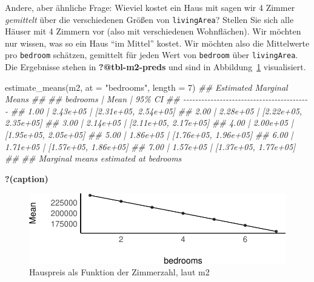 \documentclass[
  a4paper,
  DIV=11]{scrreprt}
\newenvironment{Shaded}{\begin{snugshade}}{\end{snugshade}}
\newcommand{\AttributeTok}[1]{\textcolor[rgb]{0.40,0.45,0.13}{#1}}
\newcommand{\DecValTok}[1]{\textcolor[rgb]{0.68,0.00,0.00}{#1}}
\newcommand{\DocumentationTok}[1]{\textcolor[rgb]{0.37,0.37,0.37}{\textit{#1}}}
\newcommand{\FunctionTok}[1]{\textcolor[rgb]{0.28,0.35,0.67}{#1}}
\newcommand{\NormalTok}[1]{\textcolor[rgb]{0.00,0.23,0.31}{#1}}
\newcommand{\StringTok}[1]{\textcolor[rgb]{0.13,0.47,0.30}{#1}}
\theoremstyle{definition}
\theoremstyle{remark}
\begin{document}
Andere, aber ähnliche Frage: Wieviel kostet ein Haus mit sagen wir 4
Zimmer \emph{gemittelt} über die verschiedenen Größen von
\texttt{livingArea}? Stellen Sie sich alle Häuser mit 4 Zimmern vor
(also mit verschiedenen Wohnflächen). Wir möchten nur wissen, was so ein
Haus ``im Mittel'' kostet. Wir möchten also die Mittelwerte pro
\texttt{bedroom} schätzen, gemittelt für jeden Wert von \texttt{bedroom}
über \texttt{livingArea}. Die Ergebnisse stehen in
\textbf{?@tbl-m2-preds} und sind in Abbildung~\ref{fig-m2-preds}
visualisiert.

\begin{Shaded}
\begin{Highlighting}[]
\FunctionTok{estimate\_means}\NormalTok{(m2, }\AttributeTok{at =} \StringTok{"bedrooms"}\NormalTok{, }\AttributeTok{length =} \DecValTok{7}\NormalTok{)}
\DocumentationTok{\#\# Estimated Marginal Means}
\DocumentationTok{\#\# }
\DocumentationTok{\#\# bedrooms |     Mean |               95\% CI}
\DocumentationTok{\#\# {-}{-}{-}{-}{-}{-}{-}{-}{-}{-}{-}{-}{-}{-}{-}{-}{-}{-}{-}{-}{-}{-}{-}{-}{-}{-}{-}{-}{-}{-}{-}{-}{-}{-}{-}{-}{-}{-}{-}{-}{-}{-}}
\DocumentationTok{\#\# 1.00     | 2.43e+05 | [2.31e+05, 2.54e+05]}
\DocumentationTok{\#\# 2.00     | 2.28e+05 | [2.22e+05, 2.35e+05]}
\DocumentationTok{\#\# 3.00     | 2.14e+05 | [2.11e+05, 2.17e+05]}
\DocumentationTok{\#\# 4.00     | 2.00e+05 | [1.95e+05, 2.05e+05]}
\DocumentationTok{\#\# 5.00     | 1.86e+05 | [1.76e+05, 1.96e+05]}
\DocumentationTok{\#\# 6.00     | 1.71e+05 | [1.57e+05, 1.86e+05]}
\DocumentationTok{\#\# 7.00     | 1.57e+05 | [1.37e+05, 1.77e+05]}
\DocumentationTok{\#\# }
\DocumentationTok{\#\# Marginal means estimated at bedrooms}
\end{Highlighting}
\end{Shaded}

\begin{table}

\caption{\textbf{?(caption)}}

\end{table}

\begin{figure}

{\centering \includegraphics{./kausal_files/figure-pdf/fig-m2-preds-1.pdf}

}

\caption{\label{fig-m2-preds}Hauspreis als Funktion der Zimmerzahl, laut
m2}

\end{figure}
\end{document}

